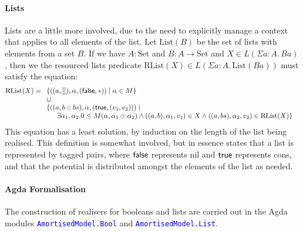 \documentclass[acmsmall,screen]{acmart}
\newcommand{\Set}{\mathrm{Set}}
\newcommand{\AgdaModule}[1]{\textcolor{blue}{\tt #1}}
\begin{document}
\paragraph{Lists} Lists are a little more involved, due to the need to
explicitly manage a context that applies to all elements of the
list. Let $\mathrm{List}(B)$ be the set of lists with elements from a
set $B$. If we have $A : \Set$ and $B : A \to \Set$ and
$X \in L(\Sigma a:A.\, B a)$, then we the resourced lists predicate
$\mathrm{RList}(X) \in L(\Sigma a : A.\, \mathrm{List}(B a))$ must
satisfy the equation:
\begin{displaymath}
  \mathrm{RList}(X) =
  \begin{array}[t]{l}
    \{ ((a, []), \alpha, (\synFalse, *)) \mid \alpha \in M \} \\
    \cup \\
    \{ \begin{array}[t]{@{}l}
         ((a, b :: bs), \alpha, (\synTrue, (v_1, v_2))) \mid \\
         \quad \exists \alpha_1, \alpha_2. 0 \leq M(\alpha, \alpha_1 \oplus \alpha_2) \land ((a, b), \alpha_1, v_1) \in X \land ((a, bs), \alpha_2, v_2) \in \mathrm{RList}(X) \}
       \end{array}
  \end{array}
\end{displaymath}
This equation has a least solution, by induction on the length of the
list being realised. This definition is somewhat involved, but in
essence states that a list is represented by tagged pairs, where
$\mathsf{false}$ represents nil and $\mathsf{true}$ represents cons, and that
the potential is distributed amongst the elements of the list as
needed.

\paragraph{Agda Formalisation} The construction of realisers for
booleans and lists are carried out in the Agda modules
\AgdaModule{AmortisedModel.Bool} and \AgdaModule{AmortisedModel.List}.


\end{document}
